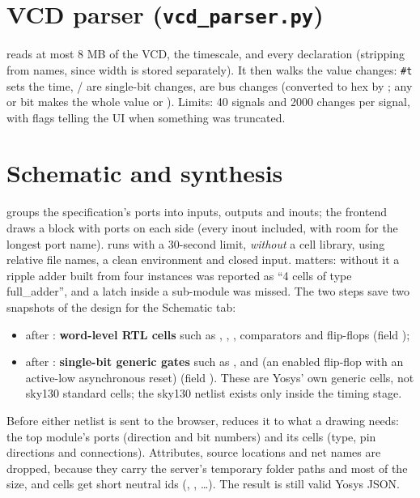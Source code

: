 \section{VCD parser (\texttt{vcd\_parser.py})}
\label{sec:vcd}

 reads at most 8 MB of the VCD, the timescale, and every  declaration (stripping \code{[3:0]} from names, since width is stored separately). It then walks the value changes: \texttt{\#t} sets the time, / are single-bit changes,  are bus changes (converted to hex by ; any  or  bit makes the whole value  or ). Limits: 40 signals and 2000 changes per signal, with flags telling the UI when something was truncated.

\section{Schematic and synthesis}
\label{sec:schematicnetlists}

 groups the specification's ports into inputs, outputs and inouts; the frontend draws a block with ports on each side (every inout included, with room for the longest port name).  runs  with a 30-second limit, \emph{without} a cell library, using relative file names, a clean environment and closed input.  matters: without it a ripple adder built from four  instances was reported as ``4 cells of type full\_adder'', and a latch inside a sub-module was missed. The two  steps save two snapshots of the design for the Schematic tab:
\begin{itemize}
  \item after : \textbf{word-level RTL cells} such as , , , comparators and  flip-flops (field );
  \item after : \textbf{single-bit generic gates} such as ,  and  (an enabled flip-flop with an active-low asynchronous reset) (field ). These are Yosys' own generic cells, not sky130 standard cells; the sky130 netlist exists only inside the timing stage.
\end{itemize}
Before either netlist is sent to the browser,  reduces it to what a drawing needs: the top module's ports (direction and bit numbers) and its cells (type, pin directions and connections). Attributes, source locations and net names are dropped, because they carry the server's temporary folder paths and most of the size, and cells get short neutral ids (, , \ldots). The result is still valid Yosys JSON.

